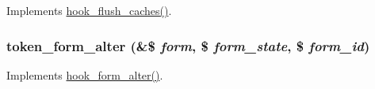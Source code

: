 \label{token_8module_ae34f0dc7cf6af04b24b316b824b2fe27}
Implements \hyperlink{group__hooks_ga66531e6e564157b7ca45ed07549c9b97}{hook\_\-flush\_\-caches()}. \hypertarget{token_8module_a6cb9dc162c6317ddc6edbc64acbc12e0}{
\subsubsection[{token\_\-form\_\-alter}]{\setlength{\rightskip}{0pt plus 5cm}token\_\-form\_\-alter (\&\$ {\em form}, \/  \$ {\em form\_\-state}, \/  \$ {\em form\_\-id})}}
\label{token_8module_a6cb9dc162c6317ddc6edbc64acbc12e0}
Implements \hyperlink{group__hooks_ga6df3cea27ae1407aeef4eae5444cb213}{hook\_\-form\_\-alter()}.

